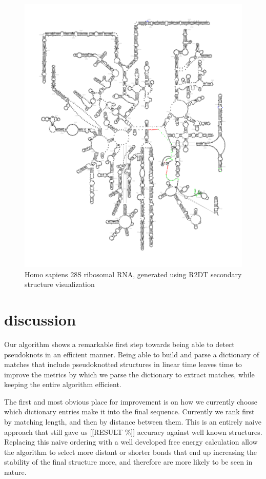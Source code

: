 \documentclass[sigconf]{acmart}
\begin{document}
\begin{figure}
  \includegraphics[width=\linewidth]{for_paper2.png}
  \caption{Homo sapiens 28S ribosomal RNA, generated using R2DT secondary structure visualization}
  \label{fig:ribosomal}
\end{figure}

\section{discussion}

Our algorithm shows a remarkable first step towards being able to detect pseudoknots in an efficient manner. Being able to build and parse a dictionary of matches that include pseudoknotted structures in linear time leaves time to improve the metrics by which we parse the dictionary to extract matches, while keeping the entire algorithm efficient. 

The first and most obvious place for improvement is on how we currently choose which dictionary entries make it into the final sequence. Currently we rank first by matching length, and then by distance between them. This is an entirely naive approach that still gave us [[RESULT \%]] accuracy against well known structures. Replacing this naive ordering with a well developed free energy calculation allow the algorithm to select more distant or shorter bonds that end up increasing the stability of the final structure more, and therefore are more likely to be seen in nature.
\end{document}
